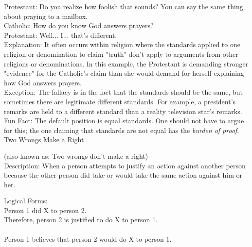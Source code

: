 \documentclass[a4paper,12pt,single,pdftex]{scrartcl}
\begin{document}
    
      Protestant: Do you realize how foolish that sounds? You can say the same thing about praying to a mailbox.
    \\

    
      Catholic: How do you know God answers prayers?
    \\

    
      Protestant: Well... I... that's different.
    \\

    
      Explanation: It often occurs within religion where the standards applied to one religion or denomination to claim "truth" don't apply to arguments from other religions or denominations. In this example, the Protestant is demanding stronger "evidence" for the Catholic's claim than she would demand for herself explaining how God answers prayers.
    \\

    
      Exception: The fallacy is in the fact that the standards should  be the same, but sometimes there are legitimate different standards. For example, a president's remarks are held to a different standard than a reality television star’s remarks.
    \\

    
      Fun Fact: The default position is equal standards. One should not have to argue for this; the one claiming that standards are not equal has the {\em burden of proof}.
    \\

  

Two Wrongs Make a Right
    
      (also known as: Two wrongs don't make a right)
    \\

  
    Description: When a person attempts to justify an action against another person because the other person did take or would take the same action against him or her.

    
      Logical Forms:
    \\

    
      Person 1 did X to person 2.
    \\

    
      Therefore, person 2 is justified to do X to person 1.
    \\

    
       
    \\

    
      Person 1 believes that person 2 would do X to person 1.
    \\
\end{document}
